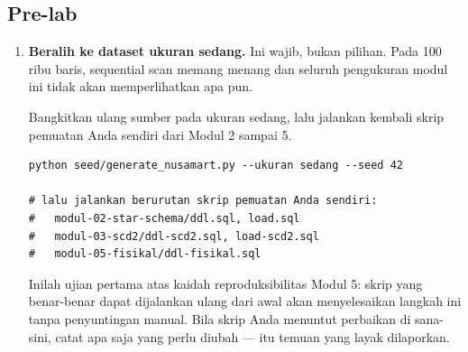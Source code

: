 \subsection{Pre-lab}

\begin{enumerate}[leftmargin=1.4em]
  \item \textbf{Beralih ke dataset ukuran sedang.} Ini wajib, bukan pilihan.
        Pada 100 ribu baris, sequential scan memang menang dan seluruh
        pengukuran modul ini tidak akan memperlihatkan apa pun.

        Bangkitkan ulang sumber pada ukuran sedang, lalu jalankan kembali
        skrip pemuatan Anda sendiri dari Modul 2 sampai 5.
\begin{lstlisting}[style=shellgaya]
python seed/generate_nusamart.py --ukuran sedang --seed 42

# lalu jalankan berurutan skrip pemuatan Anda sendiri:
#   modul-02-star-schema/ddl.sql, load.sql
#   modul-03-scd2/ddl-scd2.sql, load-scd2.sql
#   modul-05-fisikal/ddl-fisikal.sql
\end{lstlisting}

        Inilah ujian pertama atas kaidah reproduksibilitas Modul 5: skrip yang
        benar-benar dapat dijalankan ulang dari awal akan menyelesaikan langkah
        ini tanpa penyuntingan manual. Bila skrip Anda menuntut perbaikan di
        sana-sini, catat apa saja yang perlu diubah --- itu temuan yang layak
        dilaporkan.


\end{enumerate}

